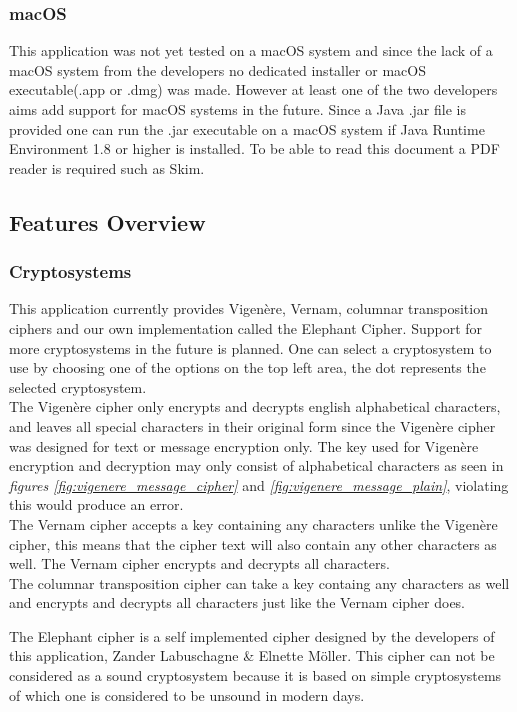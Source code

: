 \documentclass[11pt]{article}
\begin{document}
	\subsubsection{macOS}
	This application was not yet tested on a macOS system and since the lack of a macOS system from the developers no dedicated installer or macOS executable(.app or .dmg) was made. However at least one of the two developers aims add support for macOS systems in the future. Since a Java .jar file is provided one can run the .jar executable on a macOS system if Java Runtime Environment 1.8 or higher is installed. To be able to read this document a PDF reader is required such as Skim.

	\subsection{Features Overview}
	\subsubsection{Cryptosystems}
	This application currently provides Vigen\`ere, Vernam, columnar transposition ciphers and our own implementation called the Elephant Cipher. Support for more cryptosystems in the future is planned. One can select a cryptosystem to use by choosing one of the options on the top left area, the dot represents the selected cryptosystem.\\

	The Vigen\`ere cipher only encrypts and decrypts english alphabetical characters, and leaves all special characters in their original form since the Vigen\`ere cipher was designed for text or message encryption only. The key used for Vigen\`ere encryption and decryption may only consist of alphabetical characters as seen in \textit{figures \ref{fig:vigenere_message_cipher}} and \textit{\ref{fig:vigenere_message_plain}}, violating this would produce an error.\\

	The Vernam cipher accepts a key containing any characters unlike the Vigen\`ere cipher, this means that the cipher text will also contain any other characters as well. The Vernam cipher encrypts and decrypts all characters.\\

	The columnar transposition cipher can take a key containg any characters as well and encrypts and decrypts all characters just like the Vernam cipher does.

	The Elephant cipher is a self implemented cipher designed by the developers of this application, Zander Labuschagne \& Elnette M\"oller. This cipher can not be considered as a sound cryptosystem because it is based on simple cryptosystems of which one is considered to be unsound in modern days.
\end{document}
